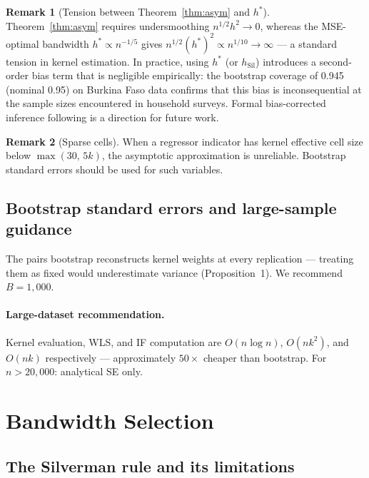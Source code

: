 \documentclass[12pt,a4paper]{article}
\theoremstyle{definition}
\newtheorem{remark}{Remark}
\begin{document}
\begin{remark}[Tension between Theorem~\ref{thm:asym} and $h^*$]
\label{rem:tension}
Theorem~\ref{thm:asym} requires undersmoothing
$n^{1/2}h^2\to 0$, whereas the MSE-optimal bandwidth $h^*
\propto n^{-1/5}$ gives $n^{1/2}(h^*)^2 \propto n^{1/10}\to\infty$
--- a standard tension in kernel estimation. In practice,
using $h^*$ (or $h_{\mathrm{Sil}}$) introduces a second-order bias
term that is negligible empirically: the bootstrap coverage of
0.945 (nominal 0.95) on Burkina Faso data confirms that this
bias is inconsequential at the sample sizes encountered in
household surveys. Formal bias-corrected inference following
\citet{CalonicoCattaneoTitiunik2014} is a direction for future work.
\end{remark}

\begin{remark}[Sparse cells]
When a regressor indicator has kernel effective cell size below
$\max(30,\,5k)$, the asymptotic approximation is unreliable. Bootstrap
standard errors should be used for such variables.
\end{remark}

\subsection{Bootstrap standard errors and large-sample guidance}

The pairs bootstrap reconstructs kernel weights at every replication ---
treating them as fixed would underestimate variance (Proposition~1).
We recommend $B=1{,}000$.

\paragraph{Large-dataset recommendation.}
Kernel evaluation, WLS, and IF computation are $O(n\log n)$, $O(nk^2)$,
and $O(nk)$ respectively --- approximately $50\times$ cheaper than
bootstrap. For $n>20{,}000$: analytical SE only.

\section{Bandwidth Selection}
\label{sec:bandwidth}

\subsection{The Silverman rule and its limitations}
\end{document}

